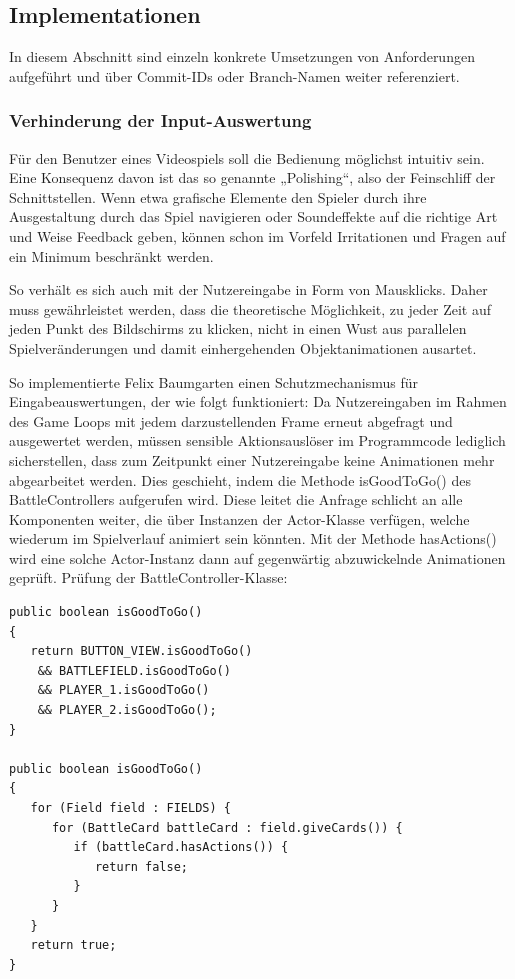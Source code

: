 \subsection{Implementationen}
In diesem Abschnitt sind einzeln konkrete Umsetzungen von Anforderungen aufgeführt und über Commit-IDs oder Branch-Namen weiter referenziert.

\subsubsection{Verhinderung der Input-Auswertung}
Für den Benutzer eines Videospiels soll die Bedienung möglichst intuitiv sein. Eine Konsequenz davon ist das so genannte „Polishing“, also der Feinschliff der Schnittstellen. Wenn etwa grafische Elemente den Spieler durch ihre Ausgestaltung durch das Spiel navigieren oder Soundeffekte auf die richtige Art und Weise Feedback geben, können schon im Vorfeld Irritationen und Fragen auf ein Minimum beschränkt werden.

So verhält es sich auch mit der Nutzereingabe in Form von Mausklicks. Daher muss gewährleistet werden, dass die theoretische Möglichkeit, zu jeder Zeit auf jeden Punkt des Bildschirms zu klicken, nicht in einen Wust aus parallelen Spielveränderungen und damit einhergehenden Objektanimationen ausartet.

So implementierte Felix Baumgarten einen Schutzmechanismus für Eingabeauswertungen, der wie folgt funktioniert: Da Nutzereingaben im Rahmen des Game Loops mit jedem darzustellenden Frame erneut abgefragt und ausgewertet werden, müssen sensible Aktionsauslöser im Programmcode lediglich sicherstellen, dass zum Zeitpunkt einer Nutzereingabe keine Animationen mehr abgearbeitet werden. Dies geschieht, indem die Methode isGoodToGo() des BattleControllers aufgerufen wird. Diese leitet die Anfrage schlicht an alle Komponenten weiter, die über Instanzen der Actor-Klasse verfügen, welche wiederum im Spielverlauf animiert sein könnten. Mit der Methode hasActions() wird eine solche Actor-Instanz dann auf gegenwärtig abzuwickelnde Animationen geprüft.
\pagebreak
Prüfung der BattleController-Klasse:
 
\begin{lstlisting}
public boolean isGoodToGo()
{
   return BUTTON_VIEW.isGoodToGo() 
	&& BATTLEFIELD.isGoodToGo() 
	&& PLAYER_1.isGoodToGo() 
	&& PLAYER_2.isGoodToGo();
}

public boolean isGoodToGo()
{
   for (Field field : FIELDS) {
      for (BattleCard battleCard : field.giveCards()) {
         if (battleCard.hasActions()) {
            return false;
         }
      }
   }
   return true;
}
\end{lstlisting}

